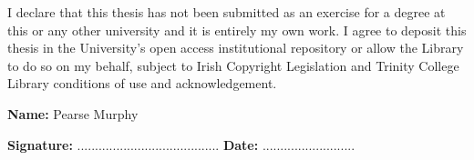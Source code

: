 \begin{abstracts}
\end{abstracts}


\restoregeometry





\begin{declaration}      

%
%
%
I declare that this thesis has not been submitted as an exercise for a degree at this or any other university and it is entirely my own work. 
I agree to deposit this thesis in the University's open access institutional repository or allow the Library to do so on my behalf, subject to Irish Copyright Legislation and Trinity College Library conditions of use and acknowledgement.

\vspace{30mm}

\textbf{Name:} Pearse Murphy

\vspace{15mm}

\textbf{Signature:}  ........................................		\textbf{Date:}  ..........................

\end{declaration}

